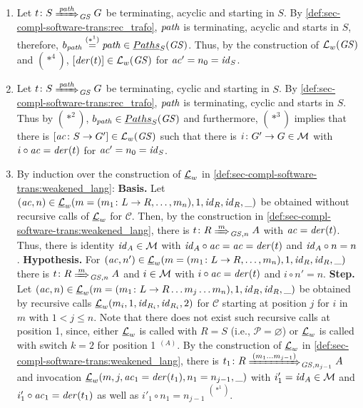 \begin{enumerate}
  \item Let $t\colon S \Trans{\paths}_\GS G$ be terminating, acyclic and starting in $S$.
  By \cref{def:sec-compl-software-trans:rec_trafo}, $\mathit{path}$ is terminating, acyclic and starts in $S$, therefore, $b_\mathit{path} \stackrel{(*^1)}{=} \mathit{path} \in \underline{Paths}_S(\mathit{GS})$.
  Thus, by the construction of $\mathcal{L}_w(\mathit{GS})$ and $(*^4)$, $[\mathit{der}(t)] \in \mathcal{L}_w(\mathit{GS})$ for $\mathit{ac}'=n_0=\mathit{id}_S$.
  \item Let $t\colon S \Trans{\paths}_\GS G$ be terminating, cyclic and starting in $S$.
  By \cref{def:sec-compl-software-trans:rec_trafo}, $\mathit{path}$ is terminating, cyclic and starts in $S$. 
  Thus by $(*^2)$, $b_\mathit{path} \in \underline{Paths}_S(\mathit{GS})$ and furthermore, $(*^3)$ implies that there is $[\mathit{ac}\colon S \to G'] \in \mathcal{L}_w(\mathit{GS})$ such that there is $i\colon G' \to G \in {\cal M}$ with $i \circ \mathit{ac}=\mathit{der}(t)$ for $\mathit{ac}'=n_0=\mathit{id}_S$.
  \item By induction over the construction of $\underline{\mathcal{L}}_w$ in \cref{def:sec-compl-software-trans:weakened_lang}:
  \textbf{Basis.}
  Let $(\mathit{ac},n) \in \underline{\mathcal{L}}_w(m=(m_1\colon L \to R,\ldots,m_n),1,\mathit{id}_R,\mathit{id}_R,\_)$ be obtained without recursive calls of $\underline{\mathcal{L}}_w$ for $\mathcal{C}$.
  Then, by the construction in \cref{def:sec-compl-software-trans:weakened_lang}, there is $t\colon R \Trans{m}_{\GS,n} A$ with $\mathit{ac}=\mathit{der}(t)$.
  Thus, there is identity $\mathit{id}_{A} \in {\cal M}$ with $\mathit{id}_{A} \circ \mathit{ac}=\mathit{ac}=\mathit{der}(t)$ and $\mathit{id}_{A} \circ n=n$.
  \textbf{Hypothesis.}
  For $(\mathit{ac},n') \in \underline{\mathcal{L}}_w(m=(m_1\colon L \to R,\ldots,m_n),1,\mathit{id}_R,\mathit{id}_R,\_)$ there is $t\colon R \Trans{m}_{\GS,n} A$ and $i \in {\cal M}$ with $i \circ \mathit{ac}=\mathit{der}(t)$ and $i \circ n'=n$.
  \textbf{Step.}
  Let $(\mathit{ac},n) \in \underline{\mathcal{L}}_w(m=(m_1\colon L \to R\ldots m_j\ldots m_n),1,\mathit{id}_R,\mathit{id}_R,\_)$ be obtained by recursive calls $\underline{\mathcal{L}}_w(m_i,1,\mathit{id}_{R_i},\mathit{id}_{R_i},2)$ for $\mathcal{C}$ starting at position $j$ for $i$ in $m$ with $1 < j \leq n$.
  Note that there does not exist such recursive calls at position 1, since, either $\underline{\mathcal{L}}_w$ is called with $R=S$ (i.e., $\mathcal{P}=\varnothing$) or $\underline{\mathcal{L}}_w$ is called with switch $k=2$ for position 1 $^{(A)}$.
  By the construction of $\underline{\mathcal{L}}_w$ in \cref{def:sec-compl-software-trans:weakened_lang}, there is $t_1\colon R \Trans{(m_1\ldots m_{j-1})}_{\GS,n_{j-1}} A$ and invocation $\underline{\mathcal{L}}_w(m,j,\mathit{ac}_1=\mathit{der}(t_1),n_1=n_{j-1},\_)$ with $i'_1=\mathit{id}_{A} \in {\cal M}$ and $i'_1 \circ \mathit{ac}_1=\mathit{der}(t_1)$ as well as $i'_1 \circ n_1=n_{j-1}$ $^{(*^1)}$.

\end{enumerate}
